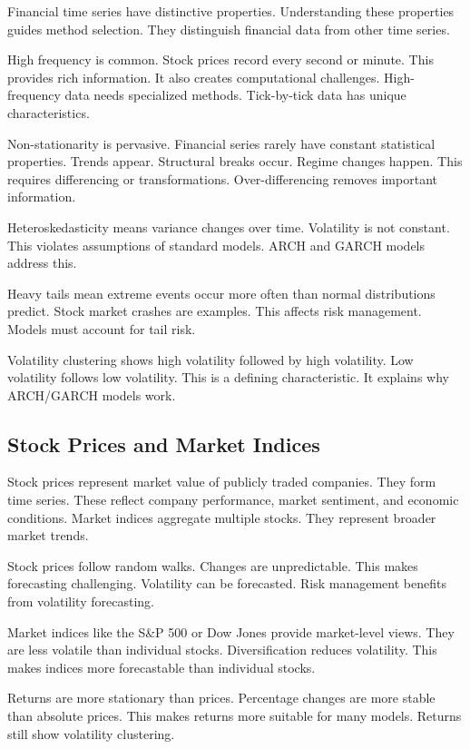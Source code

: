 Financial time series have distinctive properties. Understanding these properties guides method selection. They distinguish financial data from other time series.

High frequency is common. Stock prices record every second or minute. This provides rich information. It also creates computational challenges. High-frequency data needs specialized methods. Tick-by-tick data has unique characteristics.

Non-stationarity is pervasive. Financial series rarely have constant statistical properties. Trends appear. Structural breaks occur. Regime changes happen. This requires differencing or transformations. Over-differencing removes important information.

Heteroskedasticity means variance changes over time. Volatility is not constant. This violates assumptions of standard models. ARCH and GARCH models address this.

Heavy tails mean extreme events occur more often than normal distributions predict. Stock market crashes are examples. This affects risk management. Models must account for tail risk.

Volatility clustering shows high volatility followed by high volatility. Low volatility follows low volatility. This is a defining characteristic. It explains why ARCH/GARCH models work.

\subsection{Stock Prices and Market Indices}

Stock prices represent market value of publicly traded companies. They form time series. These reflect company performance, market sentiment, and economic conditions. Market indices aggregate multiple stocks. They represent broader market trends.

Stock prices follow random walks. Changes are unpredictable. This makes forecasting challenging. Volatility can be forecasted. Risk management benefits from volatility forecasting.

Market indices like the S\&P 500 or Dow Jones provide market-level views. They are less volatile than individual stocks. Diversification reduces volatility. This makes indices more forecastable than individual stocks.

Returns are more stationary than prices. Percentage changes are more stable than absolute prices. This makes returns more suitable for many models. Returns still show volatility clustering.

